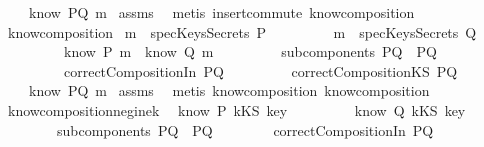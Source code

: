 \begin{isabellebody}
\ \ \ \ {\isachardoublequoteopen}know\ PQ\ m{\isachardoublequoteclose}\isanewline
%
\isadelimproof
%
\endisadelimproof
%
\isatagproof
{}\isamarkupfalse%
\ assms\ \isamarkupfalse%
\ {\isacharparenleft}metis\ insert{\isacharunderscore}commute\ know{\isacharunderscore}composition{}{\isacharparenright}%
\endisatagproof
{\isafoldproof}%
%
\isadelimproof
\isanewline
%
\endisadelimproof
\isanewline
{}\isamarkupfalse%
\ know{\isacharunderscore}composition{\isacharcolon}\isanewline
{}\ {\isachardoublequoteopen}m\ {\isasymnotin}\ specKeysSecrets\ P{\isachardoublequoteclose}\isanewline
\ \ \ \ \ \ \ \ \ {\isachardoublequoteopen}m\ {\isasymnotin}\ specKeysSecrets\ Q{\isachardoublequoteclose}\isanewline
\ \ \ \ \ \ \ \ \ {\isachardoublequoteopen}know\ P\ m\ {\isasymor}\ know\ Q\ m{\isachardoublequoteclose}\isanewline
\ \ \ \ \ \ \ \ \ {\isachardoublequoteopen}subcomponents\ PQ\ {\isacharequal}\ {\isacharbraceleft}P{\isacharcomma}Q{\isacharbraceright}{\isachardoublequoteclose}\ \isanewline
\ \ \ \ \ \ \ \ \ {\isachardoublequoteopen}correctCompositionIn\ PQ{\isachardoublequoteclose}\isanewline
\ \ \ \ \ \ \ \ \ {\isachardoublequoteopen}correctCompositionKS\ PQ{\isachardoublequoteclose}\isanewline
{}\ \ \ \ {\isachardoublequoteopen}know\ PQ\ m{\isachardoublequoteclose}\isanewline
%
\isadelimproof
%
\endisadelimproof
%
\isatagproof
{}\isamarkupfalse%
\ assms\ \isamarkupfalse%
\ {\isacharparenleft}metis\ know{\isacharunderscore}composition{}\ know{\isacharunderscore}composition{}{\isacharparenright}%
\endisatagproof
{\isafoldproof}%
%
\isadelimproof
\isanewline
%
\endisadelimproof
\isanewline
{}\isamarkupfalse%
\ know{\isacharunderscore}composition{\isacharunderscore}neg{\isacharunderscore}ine{\isacharunderscore}k{\isacharcolon}\isanewline
{}\ {\isachardoublequoteopen}{\isasymnot}\ know\ P\ {\isacharparenleft}kKS\ key{\isacharparenright}{\isachardoublequoteclose}\isanewline
\ \ \ \ \ \ \ \ {\isachardoublequoteopen}{\isasymnot}\ know\ Q\ {\isacharparenleft}kKS\ key{\isacharparenright}{\isachardoublequoteclose}\isanewline
\ \ \ \ \ \ \ \ {\isachardoublequoteopen}subcomponents\ PQ\ {\isacharequal}\ {\isacharbraceleft}P{\isacharcomma}Q{\isacharbraceright}{\isachardoublequoteclose}\isanewline
\ \ \ \ \ \ \ \ {\isachardoublequoteopen}correctCompositionIn\ PQ{\isachardoublequoteclose}\isanewline

\end{isabellebody}
